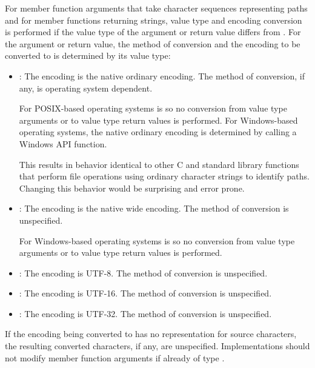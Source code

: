 \pnum
For member function arguments that take character sequences representing
paths and for member functions returning strings, value type and encoding
conversion is performed if the value type of the argument or return value differs from
.
For the argument or return value, the method of conversion and the encoding
to be converted to is determined
by its value type:
\begin{itemize}
\item {}: The encoding is the native ordinary encoding.
The method of conversion, if any, is operating system dependent.
\begin{note}
For POSIX-based operating systems  is 
so no conversion from  value type arguments or to 
value type return values is performed.
For Windows-based operating systems, the
native ordinary encoding is determined by calling a Windows API function.
\end{note}
\begin{note}
This results in behavior identical to other C and \Cpp{}
standard library functions that perform file operations using ordinary character
strings to identify paths. Changing this behavior would be surprising and error
prone.
\end{note}
\item {}: The encoding is the native wide encoding.
The method of conversion is unspecified.
\begin{note}
For Windows-based operating systems  is 
so no conversion from  value type arguments or to 
value type return values is performed.
\end{note}
\item
{}%
: The encoding is UTF-8. The method of conversion
is unspecified.
\item
{}%
: The encoding is UTF-16. The method of conversion
is unspecified.
\item
{}%
: The encoding is UTF-32. The method of conversion
is unspecified.
\end{itemize}

\pnum
If the encoding being converted to has no representation for source
characters, the resulting converted characters, if any, are unspecified.
Implementations should not modify member function arguments
if already of type .

